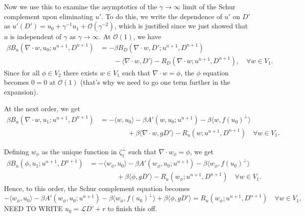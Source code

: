 \documentclass{article}
\begin{document}
Now we use this to examine the asymptotics of the $\gamma\to \infty$
limit of the Schur complement upon eliminating $u'$. To do this, we
write the dependence of $u'$ on $D'$ as $u'(D') =u_0 + \gamma^{-1} u_1
+ \mathcal{O}(\gamma^{-2})$, which is justified since we just showed
that $u$ is independent of $\gamma$ as $\gamma\to \infty$. At
$\mathcal{O}(1)$, we have
\begin{align}
  \nonumber \beta B_u(\nabla\cdot w, u_0; u^{n+1},D^{n+1}) & = - \beta
  B_D(\nabla\cdot w, D'; u^{n+1},D^{n+1}) \\ & \qquad -\langle
  \nabla\cdot w, D' \rangle -R_D(\nabla\cdot w;u^{n+1},D^{n+1}), \quad
  \forall w\in V_1.
\end{align}
Since for all $\phi\in V_2$ there exists $w\in V_1$ such that
$\nabla\cdot w = \phi$, the $\phi$ equation becomes $0=0$ at
$\mathcal{O}(1)$ (that's why we need to go one term further in the
expansion).

At the next order, we get
\begin{align}
  \nonumber
  \beta B_u(\nabla\cdot w, u_1; u^{n+1},D^{n+1})
  & = 
  -\langle w, u_0 \rangle - \beta A'(w, u_0; u^{n+1})
  - \beta\langle w, f(u_0)^{\perp}\rangle \\
  & \qquad\qquad
  + \beta\langle \nabla\cdot w, gD'\rangle
  -R_u(w;u^{n+1},D^{n+1})
  \quad \forall w \in V_1.
\end{align}

Defining $w_\phi$ as the unique function in $\zeta_1^{\perp}$ such
that $\nabla\cdot w_\phi=\phi$, we get
\begin{align}
  \nonumber
  \beta B_u(\phi, u_1; u^{n+1},D^{n+1})
  & = 
  -\langle w_{\phi}, u_0 \rangle - \beta A'(w_\phi, u_0; u^{n+1})
  - \beta\langle w_\phi, f(u_0)^{\perp}\rangle \\
  & \qquad\qquad
  + \beta\langle \phi, gD'\rangle
  -R_u(w_\phi;u^{n+1},D^{n+1})
  \quad \forall w \in V_1.
\end{align}
Hence, to this order, the Schur complement equation becomes
\begin{equation}
    -\langle w_{\phi}, u_0 \rangle - \beta A'(w_\phi, u_0; u^{n+1})
  - \beta\langle w_\phi, f(u_0)^{\perp}\rangle
  + \beta\langle \phi, gD'\rangle
   = R_u(w_\phi;u^{n+1},D^{n+1})
  \quad \forall w \in V_1,
\end{equation}
NEED TO WRITE $u_0 = \mathcal{L}D' + r$ to finish this off.
\end{document}

